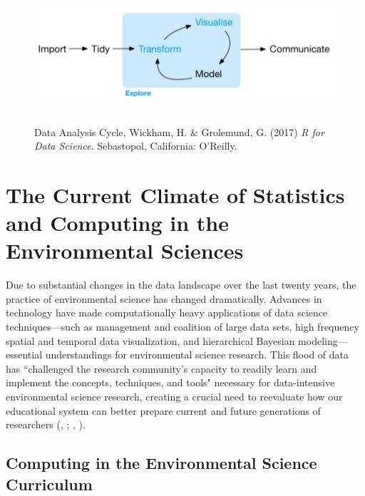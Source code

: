 \documentclass[12pt]{article}
\begin{document}
\begin{figure}[h!]
    \centering
    \includegraphics[width = \textwidth, height = 2in]{images/cycle.png}
    \caption{Data Analysis Cycle, Wickham, H. \& Grolemund, G. (2017) \emph{R 
    for Data Science}. Sebastopol, California: O'Reilly.}
\label{fig:cycle}
\end{figure} 

\section{The Current Climate of Statistics and Computing in the Environmental 
Sciences}
\label{sec:lit}

\noindent Due to substantial changes in the data landscape over the last twenty
years, the practice of environmental science has changed dramatically. Advances
in technology have made computationally heavy 
applications of data science techniques---such as management and coalition of 
large data sets, high frequency spatial and temporal data visualization, and 
hierarchical Bayesian modeling---essential understandings for environmental 
science research. This flood of data has ``challenged the research community's 
capacity to readily learn and implement the concepts, techniques, and tools" 
\citep[p.\ 546]{hampton} necessary for data-intensive environmental science 
research, creating a crucial need to reevaluate how our educational system can
better prepare current and future generations of researchers 
(\citeauthor{green}, \citeyear{green}; \citeauthor{hampton}, 
\citeyear{hampton}).  

\subsection{Computing in the Environmental Science Curriculum}
\end{document}
